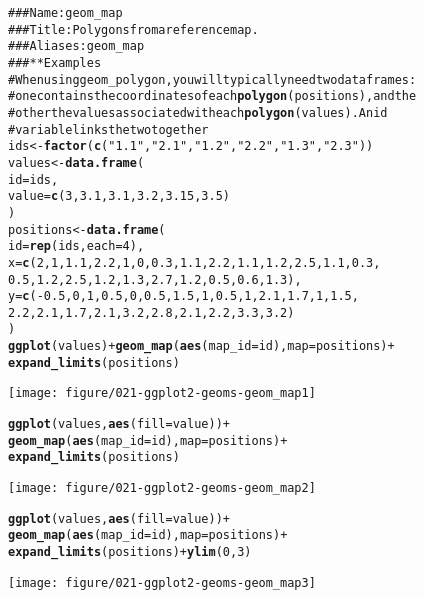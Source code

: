 \documentclass[a4paper,titlepage]{tufte-handout}\usepackage{graphicx, color}
\makeatletter
\def\maxwidth{ %
  \ifdim\Gin@nat@width>\linewidth
    \linewidth
  \else
    \Gin@nat@width
  \fi
}
\newcommand{\hlfunctioncall}[1]{\textcolor[rgb]{0.501960784313725,0,0.329411764705882}{\textbf{#1}}}%
\newcommand{\hlstring}[1]{\textcolor[rgb]{0.6,0.6,1}{#1}}%
\newcommand{\hlcomment}[1]{\textcolor[rgb]{0.180392156862745,0.6,0.341176470588235}{#1}}%
\newenvironment{kframe}{%
 \def\at@end@of@kframe{}%
 \ifinner\ifhmode%
  \def\at@end@of@kframe{\end{minipage}}%
  \begin{minipage}{\columnwidth}%
 \fi\fi%
 \def\FrameCommand##1{\hskip\@totalleftmargin \hskip-\fboxsep
 \colorbox{shadecolor}{##1}\hskip-\fboxsep
     \hskip-\linewidth \hskip-\@totalleftmargin \hskip\columnwidth}%
 \MakeFramed {\advance\hsize-\width
   \@totalleftmargin\z@ \linewidth\hsize
   \@setminipage}}%
 {\par\unskip\endMakeFramed%
 \at@end@of@kframe}
\newenvironment{knitrout}{}{} %
\makeatother
\begin{document}
\begin{knitrout}
\color{fgcolor}\begin{kframe}
\begin{alltt}
\hlcomment{### Name: geom_map}
\hlcomment{### Title: Polygons from a reference map.}
\hlcomment{### Aliases: geom_map}
\hlcomment{### ** Examples}
\hlcomment{# When using geom_polygon, you will typically need two data frames:}
\hlcomment{# one contains the coordinates of each \hlfunctioncall{polygon} (positions),  and the}
\hlcomment{# other the values associated with each \hlfunctioncall{polygon} (values).  An id}
\hlcomment{# variable links the two together}
ids <- \hlfunctioncall{factor}(\hlfunctioncall{c}(\hlstring{"1.1"}, \hlstring{"2.1"}, \hlstring{"1.2"}, \hlstring{"2.2"}, \hlstring{"1.3"}, \hlstring{"2.3"}))
values <- \hlfunctioncall{data.frame}(
  id = ids,
  value = \hlfunctioncall{c}(3, 3.1, 3.1, 3.2, 3.15, 3.5)
)
positions <- \hlfunctioncall{data.frame}(
  id = \hlfunctioncall{rep}(ids, each = 4),
  x = \hlfunctioncall{c}(2, 1, 1.1, 2.2, 1, 0, 0.3, 1.1, 2.2, 1.1, 1.2, 2.5, 1.1, 0.3,
  0.5, 1.2, 2.5, 1.2, 1.3, 2.7, 1.2, 0.5, 0.6, 1.3),
  y = \hlfunctioncall{c}(-0.5, 0, 1, 0.5, 0, 0.5, 1.5, 1, 0.5, 1, 2.1, 1.7, 1, 1.5,
  2.2, 2.1, 1.7, 2.1, 3.2, 2.8, 2.1, 2.2, 3.3, 3.2)
)
\hlfunctioncall{ggplot}(values) + \hlfunctioncall{geom_map}(\hlfunctioncall{aes}(map_id = id), map = positions) +
  \hlfunctioncall{expand_limits}(positions)
\end{alltt}
\end{kframe}\texttt{[image: figure/021-ggplot2-geoms-geom\_map1]} \begin{kframe}\begin{alltt}
\hlfunctioncall{ggplot}(values, \hlfunctioncall{aes}(fill = value)) +
  \hlfunctioncall{geom_map}(\hlfunctioncall{aes}(map_id = id), map = positions) +
  \hlfunctioncall{expand_limits}(positions)
\end{alltt}
\end{kframe}\texttt{[image: figure/021-ggplot2-geoms-geom\_map2]} \begin{kframe}\begin{alltt}
\hlfunctioncall{ggplot}(values, \hlfunctioncall{aes}(fill = value)) +
  \hlfunctioncall{geom_map}(\hlfunctioncall{aes}(map_id = id), map = positions) +
  \hlfunctioncall{expand_limits}(positions) + \hlfunctioncall{ylim}(0, 3)
\end{alltt}
\end{kframe}\texttt{[image: figure/021-ggplot2-geoms-geom\_map3]} \begin{kframe}\begin{alltt}

\end{alltt}
\end{kframe}
\end{knitrout}
\end{document}
